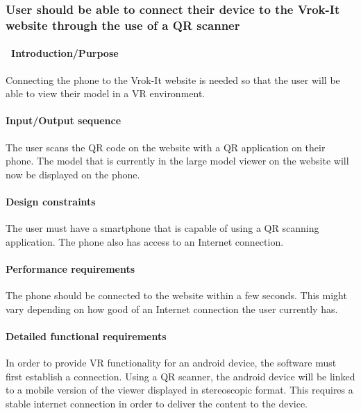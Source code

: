 \documentclass[letterpaper, 10pt, draftclsnofoot, compsoc, onecolumn]{IEEEtran}
\begin{document}
{\subsubsection[{Smartphone Connection}]{\rmfamily\bfseries\color{black} User should be able to connect their device to
the Vrok-It website through the use of a QR scanner}
\paragraph[\ Introduction/Purpose of this
feature]{\foreignlanguage{english}{\ }\foreignlanguage{english}{Introduction/Purpose
}}
{\color{black}
Connecting the phone to the Vrok-It website is needed so that the user will be able to view their model in a VR environment. }

\paragraph[Input/Output sequence for this
feature]{\rmfamily\bfseries\color{black}
Input/Output sequence }
{\color{black}
The user scans the QR code on the website with a QR application on their phone. The model that is currently in the large model viewer on 
the website will now be displayed on the phone. }

\paragraph[Design constraints of this
feature]{\rmfamily\bfseries\color{black} Design
constraints }
{\color{black}
The user must have a smartphone that is capable of using a QR scanning application. The phone also has access to an Internet connection. }

\paragraph[Performance requirements of this
feature]{\rmfamily\bfseries\color{black}
Performance requirements }
{\color{black}
The phone should be connected to the website within a few seconds. This might vary depending on how good of an Internet connection the user currently 
has. }

\paragraph[Detailed functional requirements of this
feature]{\rmfamily\bfseries\color{black}
Detailed functional requirements }
{\color{black}
In order to provide VR functionality for an android device, the software must first establish a connection. Using a QR scanner, the android device will be linked to a mobile version of the viewer displayed in stereoscopic format. This requires a stable internet connection in order to deliver the content to the device. }

}
\end{document}
